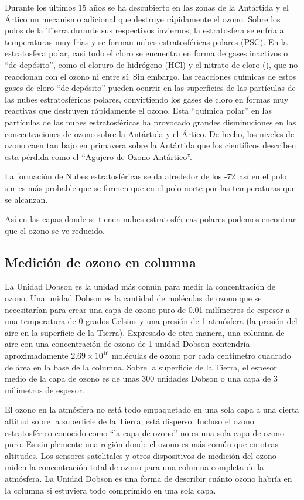 Durante los últimos 15 años se ha descubierto en las zonas de la Antártida y el Ártico un mecanismo adicional que destruye rápidamente el ozono. Sobre los polos de la Tierra durante sus respectivos inviernos, la estratosfera se enfría a temperaturas muy frías y se forman nubes estratosféricas polares (PSC). En la estratosfera polar, casi todo el cloro se encuentra en forma de gases inactivos o ``de depósito'', como el cloruro de hidrógeno (HCl) y el nitrato de cloro (), que no reaccionan con el ozono ni entre sí. Sin embargo, las reacciones químicas de estos gases de cloro ``de depósito''  pueden ocurrir en las superficies de las partículas de las nubes estratosféricas polares, convirtiendo los gases de cloro en formas muy reactivas que destruyen rápidamente el ozono. Esta ``química polar'' en las partículas de las nubes estratosféricas ha provocado grandes disminuciones en las concentraciones de ozono sobre la Antártida y el Ártico. De hecho, los niveles de ozono caen tan bajo en primavera sobre la Antártida que los científicos describen esta pérdida como el ``Agujero de Ozono Antártico''.

La formación de Nubes estratosféricas se da alrededor de los -72\celsius\, así en el polo sur es más probable que se formen que en el polo norte por las temperaturas que se alcanzan.

Así en las capas donde se tienen nubes estratosféricas polares podemos encontrar que el ozono se ve reducido.

\subsection{Medición de ozono en columna}
La Unidad Dobson es la unidad más común para medir la concentración de ozono. Una unidad Dobson es la cantidad de moléculas de ozono que se necesitarían para crear una capa de ozono puro de 0.01 milímetros de espesor a una temperatura de 0 grados Celsius y una presión de 1 atmósfera (la presión del aire en la superficie de la Tierra). Expresado de otra manera, una columna de aire con una concentración de ozono de 1 unidad Dobson contendría aproximadamente $2.69\times10^{16}$ moléculas de ozono por cada centímetro cuadrado de área en la base de la columna. Sobre la superficie de la Tierra, el espesor medio de la capa de ozono es de unas 300 unidades Dobson o una capa de 3 milímetros de espesor.

El ozono en la atmósfera no está todo empaquetado en una sola capa a una cierta altitud sobre la superficie de la Tierra; está disperso. Incluso el ozono estratosférico conocido como ``la capa de ozono'' no es una sola capa de ozono puro. Es simplemente una región donde el ozono es más común que en otras altitudes. Los sensores satelitales y otros dispositivos de medición del ozono miden la concentración total de ozono para una columna completa de la atmósfera. La Unidad Dobson es una forma de describir cuánto ozono habría en la columna si estuviera todo comprimido en una sola capa.

